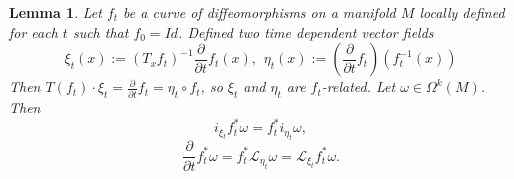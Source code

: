 \documentclass{article}
\numberwithin{theorem}{section}
\newtheorem{lemma}[theorem]{Lemma} %
\theoremstyle{definition}
\begin{document}
\begin{lemma} \label{lemmaFlows}
    Let $f_t$ be a curve of diffeomorphisms on a manifold $M$ locally defined for each $t$ such that $f_0 = Id$. Defined two time dependent vector fields
    \begin{equation}
        \xi_t(x):=\left(T_x f_t\right)^{-1} \frac{\partial}{\partial t} f_t(x), \hspace{5pt} \eta_t(x):=\left(\frac{\partial}{\partial t} f_t\right)\left(f_t^{-1}(x)\right)
    \end{equation}
    Then $T\left(f_t\right) \cdot \xi_t=\frac{\partial}{\partial t} f_t=\eta_t \circ f_t$, so $\xi_t$ and $\eta_t$ are $f_t$-related. Let $\omega \in \Omega^k(M)$. Then
    \begin{equation}\label{eqFlows1}
        i_{\xi_t} f_t^* \omega=f_t^* i_{\eta_t} \omega, 
    \end{equation}
    \begin{equation}\label{eqFlows2}
        \frac{\partial}{\partial t} f_t^* \omega=f_t^* \mathcal{L}_{\eta_t} \omega=\mathcal{L}_{\xi_t} f_t^* \omega.
    \end{equation}
\end{lemma}
\end{document}
